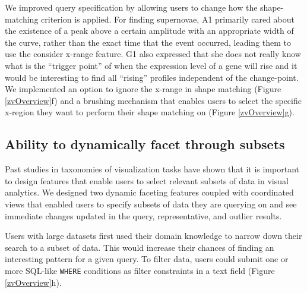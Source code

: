  We improved query specification by allowing users to change how the shape-matching criterion is applied. For finding supernovae, A1 primarily cared about the existence of a peak above a certain amplitude with an appropriate width of the curve, rather than the exact time that the event occurred, leading them to use the consider x-range feature. G1 also expressed that she does not really know what is the ``trigger point'' of when the expression level of a gene will rise and it would be interesting to find all ``rising'' profiles independent of the change-point.  We implemented an option to ignore the x-range in shape matching (Figure \ref{zvOverview}f) and a brushing mechanism that enables users to select the specific x-region they want to perform their shape matching on (Figure \ref{zvOverview}g). 
\subsection{Ability to dynamically facet through subsets}
\par Past studies in taxonomies of visualization tasks have shown that it is important to design features that enable users to select relevant subsets of data in visual analytics\cite{Amar2005,Heer2012}. We designed two dynamic faceting features coupled with coordinated views that enabled users to specify subsets of data they are querying on and see immediate changes updated in the query, representative, and outlier results. 

 Users with large datasets first used their domain knowledge to narrow down their search to a subset of data. This would increase their chances of finding an interesting pattern for a given query. To filter data, users could submit one or more SQL-like \texttt{WHERE} conditions as filter constraints in a text field (Figure \ref{zvOverview}h).  

